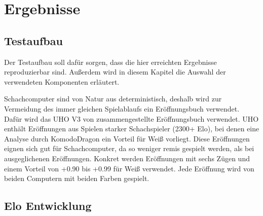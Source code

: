 \chapter{Ergebnisse}
\label{chap:Ergebnisse}

\section{Testaufbau}

Der Testaufbau soll dafür sorgen, dass die hier erreichten Ergebnisse reproduzierbar sind. Außerdem wird in diesem Kapitel die Auswahl der verwendeten Komponenten erläutert.

Schachcomputer sind von Natur aus deterministisch, deshalb wird zur Vermeidung des immer gleichen Spielablaufs ein Eröffnungsbuch verwendet. Dafür wird das \ac{UHO} V3 von \citeauthor{Pohl2021} \cite{Pohl2021} zusammengestellte Eröffnungsbuch verwendet. \ac{UHO} enthält Eröffnungen aus Spielen starker Schachspieler (2300+ Elo), bei denen eine Analyse durch KomodoDragon \cite{KomodoDragon} ein Vorteil für Weiß vorliegt. Diese Eröffnungen eignen sich gut für Schachcomputer, da so weniger remis gespielt werden, als bei ausgeglichenen Eröffnungen. Konkret werden Eröffnungen mit sechs Zügen und einem Vorteil von +0.90 bis +0.99 für Weiß verwendet. Jede Eröffnung wird von beiden Computern mit beiden Farben gespielt.

\section{Elo Entwicklung}


